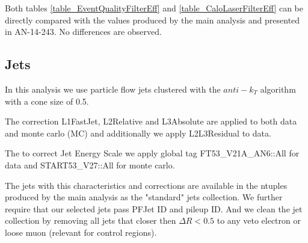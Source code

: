 

Both tables \ref{table_EventQualityFilterEff} and \ref{table_CaloLaserFilterEff} can be directly compared with the values produced by the main analysis and presented in AN-14-243\cite{CMS_AN_2014-243}. No differences are observed.

\subsection{Jets}

In this analysis we use particle flow  jets clustered with the $anti-k_{T}$ algorithm with a cone size of 0.5. 

The correction L1FastJet, L2Relative and L3Absolute are applied to both data and monte carlo (MC) and additionally we apply L2L3Residual to data.

The to correct Jet Energy Scale we apply global tag FT53\_V21A\_AN6::All for data and START53\_V27::All for monte carlo.

The jets with this characteristics and corrections are available in the ntuples produced by the main analysis as the "standard" jets collection. We further require that our selected jets pass PFJet ID and pileup ID. And we clean the jet collection by removing all jets that closer then $\Delta R < 0.5$ to any veto electron or loose muon (relevant for control regions).

 
